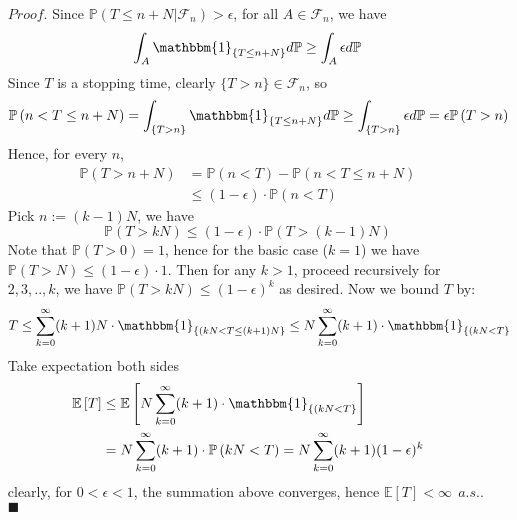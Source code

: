 \documentclass[a4paper,12pt,twoside]{book}
\begin{document}
\begin{itemize}
\begin{itemize}
	\item[$Proof$.] Since $\mathbb{P}\left(T\leq n+N | \mathcal{F}_n\right)>\epsilon$, for all $A\in \mathcal{F}_n$, we have
	\begin{equation}
		\int_A \mathbbm{1}_{\{T\leq n+N\}} d\mathbb{P} \geq \int_A \epsilon d\mathbb{P}
	\end{equation}
	Since $T$ is a stopping time, clearly $\{T>n\}\in \mathcal{F}_n$, so
	\begin{equation}
		\mathbb{P}\left(n<T\leq n+N\right)=\int_{\{T>n\}} \mathbbm{1}_{\{T\leq n+N\}} d\mathbb{P} \geq \int_{\{T>n\}} \epsilon d\mathbb{P} = \epsilon \mathbb{P}\left(T>n\right)
	\end{equation}
	Hence, for every $n$,
	\begin{equation}
		\begin{split}
			\mathbb{P}\left(T>n+N\right)&=\mathbb{P}\left(n<T\right)-\mathbb{P}\left(n<T\leq n+N\right)\\
			&\leq(1-\epsilon)\cdot\mathbb{P}\left(n<T\right)
		\end{split}
	\end{equation}
	Pick $n:=(k-1)N$, we have 
	\begin{equation}
		\mathbb{P}\left(T>kN\right)\leq(1-\epsilon)\cdot\mathbb{P}\left(T>(k-1)N\right)
	\end{equation}
	Note that $\mathbb{P}\left(T>0\right)=1$, hence for the basic case ($k=1$) we have $\mathbb{P}\left(T>N\right)\leq (1-\epsilon)\cdot 1$. Then for any $k>1$, proceed recursively for $2,3,..,k$, we have $\mathbb{P}\left(T>kN\right)\leq(1-\epsilon)^k$ as desired. Now we bound $T$ by:
	\begin{equation}
		T \leq \sum_{k=0}^{\infty} (k+1)N \cdot \mathbbm{1}_{\{(kN<T\leq (k+1)N\}}\leq N\sum_{k=0}^{\infty} (k+1) \cdot \mathbbm{1}_{\{(kN<T\}}
	\end{equation}
	Take expectation both sides
	\begin{equation}
		\begin{split}
			\mathbb{E}\left[T\right]&\leq \mathbb{E}\left[N\sum_{k=0}^{\infty} (k+1) \cdot \mathbbm{1}_{\{(kN<T\}}\right]\\
			&=N\sum_{k=0}^{\infty} (k+1) \cdot \mathbb{P}\left(kN<T\right)=N\sum_{k=0}^{\infty} (k+1)(1-\epsilon)^k
		\end{split}
	\end{equation}
	clearly, for $0<\epsilon<1$, the summation above converges, hence $\mathbb{E}\left[T\right]<\infty~~a.s.$. $\blacksquare$
\end{itemize}


\end{itemize}
\end{document}
